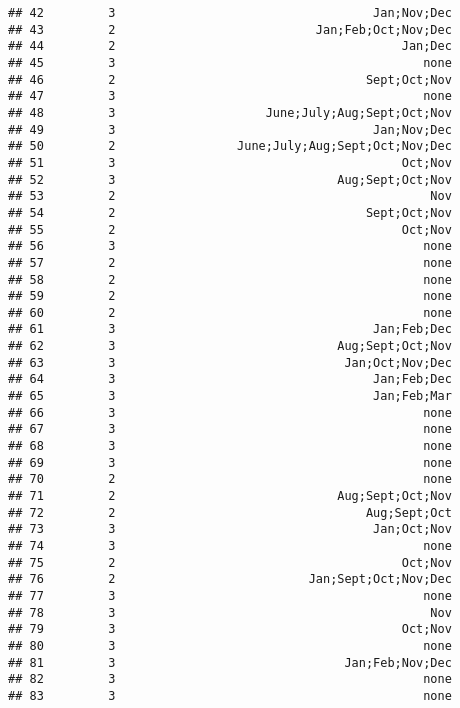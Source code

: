 \documentclass[
]{article}
\begin{document}
\begin{verbatim}
## 42         3                                    Jan;Nov;Dec
## 43         2                            Jan;Feb;Oct;Nov;Dec
## 44         2                                        Jan;Dec
## 45         3                                           none
## 46         2                                   Sept;Oct;Nov
## 47         3                                           none
## 48         3                     June;July;Aug;Sept;Oct;Nov
## 49         3                                    Jan;Nov;Dec
## 50         2                 June;July;Aug;Sept;Oct;Nov;Dec
## 51         3                                        Oct;Nov
## 52         3                               Aug;Sept;Oct;Nov
## 53         2                                            Nov
## 54         2                                   Sept;Oct;Nov
## 55         2                                        Oct;Nov
## 56         3                                           none
## 57         2                                           none
## 58         2                                           none
## 59         2                                           none
## 60         2                                           none
## 61         3                                    Jan;Feb;Dec
## 62         3                               Aug;Sept;Oct;Nov
## 63         3                                Jan;Oct;Nov;Dec
## 64         3                                    Jan;Feb;Dec
## 65         3                                    Jan;Feb;Mar
## 66         3                                           none
## 67         3                                           none
## 68         3                                           none
## 69         3                                           none
## 70         2                                           none
## 71         2                               Aug;Sept;Oct;Nov
## 72         2                                   Aug;Sept;Oct
## 73         3                                    Jan;Oct;Nov
## 74         3                                           none
## 75         2                                        Oct;Nov
## 76         2                           Jan;Sept;Oct;Nov;Dec
## 77         3                                           none
## 78         3                                            Nov
## 79         3                                        Oct;Nov
## 80         3                                           none
## 81         3                                Jan;Feb;Nov;Dec
## 82         3                                           none
## 83         3                                           none

\end{verbatim}
\end{document}
